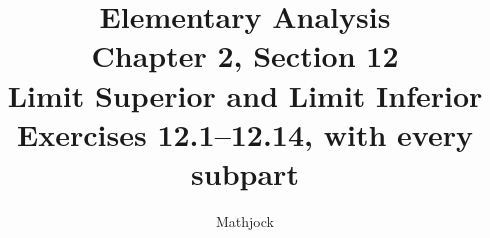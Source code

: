 
\title{\textbf{Elementary Analysis}\\[0.3em]
Chapter 2, Section 12\\[0.3em]
\large Limit Superior and Limit Inferior\\
Exercises 12.1--12.14, with every subpart}
\author{Mathjock}
\date{}

\maketitle
\bookinfo
\tableofcontents
\clearpage
\setcounter{section}{11}


